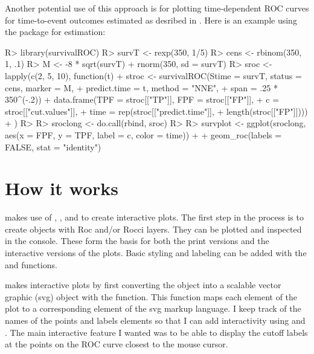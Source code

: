 \documentclass[codesnippet]{jss}
\begin{document}
Another potential use of this approach is for plotting time-dependent
ROC curves for time-to-event outcomes estimated as desribed in
\citep{heagerty2000time}. Here is an example using the 
package \citep{survroc} for estimation:

\begin{Schunk}
\begin{Sinput}
R> library(survivalROC)
R> survT <- rexp(350, 1/5)
R> cens <- rbinom(350, 1, .1)
R> M <- -8 * sqrt(survT) + rnorm(350, sd = survT)
R> sroc <- lapply(c(2, 5, 10), function(t){ 
+   stroc <- survivalROC(Stime = survT, status = cens, marker = M, 
+                        predict.time = t, method = "NNE", 
+                        span = .25 * 350^(-.2))
+   data.frame(TPF = stroc[["TP"]], FPF = stroc[["FP"]], 
+              c = stroc[["cut.values"]], 
+              time = rep(stroc[["predict.time"]], 
+                         length(stroc[["FP"]])))
+   })
R> 
R> sroclong <- do.call(rbind, sroc)
R> 
R> survplot <- ggplot(sroclong, aes(x = FPF, y = TPF, label = c, color = time)) + 
+   geom_roc(labels = FALSE, stat = "identity")
\end{Sinput}
\end{Schunk}

\section{How it works}\label{how-it-works}

 makes use of  \citep{ggplot2}, 
\citep{gridsvg}, and  \citep{bostock2011d3} to create
interactive plots. The first step in the process is to create
 objects with Roc and/or Rocci layers. They can be plotted
and inspected in the  console. These form the basis for both
the print versions and the interactive versions of the plots. Basic
styling and labeling can be added with the  and
 functions.

 makes interactive plots by first converting the
 object into a scalable vector graphic (svg) object with
the  function. This function maps each
element of the plot to a corresponding element of the svg markup
language. I keep track of the names of the points and labels elements so
that I can add interactivity using  and
. The main interactive feature I wanted was to be
able to display the cutoff labels at the points on the ROC curve closest
to the mouse cursor.
\end{document}
